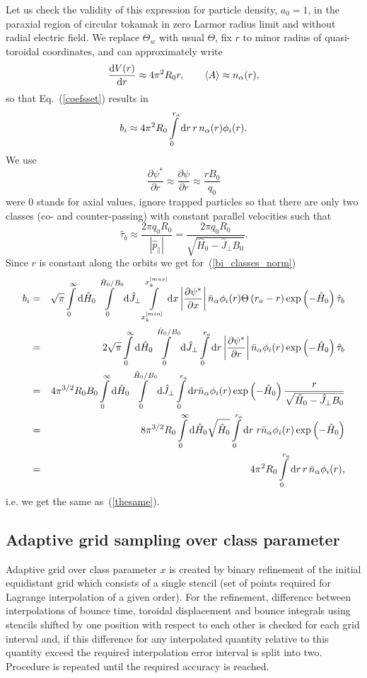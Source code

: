 \documentclass[preprint,prb,aps]{revtex4-1}
\newcommand{\be}[1]{\begin{equation} \label{#1}}
\newcommand{\ee}{\end{equation}}
\newcommand{\bea}[1]{\begin{eqnarray} \label{#1}}
\newcommand{\eea}{\end{eqnarray}}
\newcommand{\eq}[1]{(\ref{#1})}
\newcommand{\difp}[2]{\frac{\partial #1}{\partial #2}}
\newcommand{\rd}{{\rm d}}
\begin{document}
Let us check the validity of this expression for particle 
density, $a_0=1$, in the paraxial region
of circular tokamak in zero Larmor radius limit and without radial electric field. 
We replace $\Theta_w$ with usual $\Theta$, 
fix $r$ to minor radius of quasi-toroidal coordinates,
and can approximately write
$$
\frac{\rd V(r)}{\rd r} \approx 4\pi^2 R_0 r,
\qquad
\langle A \rangle \approx n_\alpha(r),
$$
so that Eq.~\eq{coefsset} results in
\be{thesame}
b_i \approx 4\pi^2 R_0 \int\limits_0^{r_a}\rd r\, r\, n_\alpha(r)\phi_i(r).
\ee
We use
$$
\difp{\psi^\ast}{r} \approx \difp{\psi}{r} \approx \frac{r B_0}{q_0}
$$
were 0 stands for axial values, ignore trapped particles so that there are only
two classes (co- and counter-passing) with constant parallel velocities such that
$$
\hat \tau_b \approx \frac{2\pi q_0R_0 }{|\hat p_\parallel|}
=\frac{2\pi q_0R_0}{\sqrt{\hat H_0 -\hat J_\perp B_0}}.
$$
Since $r$ is constant along the orbits we get for~\eq{bi_classes_norm}
\bea{bi_check}
b_i &=& \sqrt{\pi}
\int\limits_{0}^\infty \rd \hat H_0
\int\limits_0^{\hat H_0/B_0} \rd \hat J_\perp
\int\limits_{x^{[min]}_k}^{x^{[max]}_k} \rd x
\left|\difp{\psi^\ast}{x}\right|
\bar n_\alpha \phi_i(r) \Theta\left(r_a-r\right)
\exp\left(-\hat H_0\right)
\hat \tau_b
\nonumber \\
&=&
2\sqrt{\pi}
\int\limits_{0}^\infty \rd \hat H_0
\int\limits_0^{\hat H_0/B_0} \rd \hat J_\perp
\int\limits_0^{r_a} \rd r
\left|\difp{\psi^\ast}{r}\right|
\bar n_\alpha \phi_i(r)
\exp\left(-\hat H_0\right)
\hat \tau_b
\nonumber \\
&=&
4\pi^{3/2}R_0B_0
\int\limits_{0}^\infty \rd \hat H_0
\int\limits_0^{\hat H_0/B_0} \rd \hat J_\perp
\int\limits_0^{r_a} \rd r
\bar n_\alpha \phi_i(r) 
\exp\left(-\hat H_0\right)
\frac{r}
{\sqrt{\hat H_0 -\hat J_\perp B_0}}
\nonumber \\
&=&
8\pi^{3/2}R_0
\int\limits_{0}^\infty \rd \hat H_0
\sqrt{\hat H_0}
\int\limits_0^{r_a} \rd r \;r
\bar n_\alpha \phi_i(r)
\exp\left(-\hat H_0\right)
\nonumber \\
&=&
4\pi^2R_0
\int\limits_0^{r_a} \rd r \,r\,
\bar n_\alpha \phi_i(r),
\eea
i.e. we get the same as~\eq{thesame}.

\subsection{Adaptive grid sampling over class parameter}
\label{ssec:adaptive}

Adaptive grid over class parameter $x$ is created by binary refinement of the initial
equidistant grid which consists of a single stencil (set of points required for
Lagrange interpolation of a given order). For the refinement, difference between
interpolations of bounce time, toroidal displacement and bounce integrals using
stencils shifted by one position with respect to each other 
is checked for each grid interval and, if this difference for any interpolated 
quantity relative to this quantity exceed the required interpolation error interval
is split into two. Procedure is repeated until the required accuracy is reached.
\end{document}
